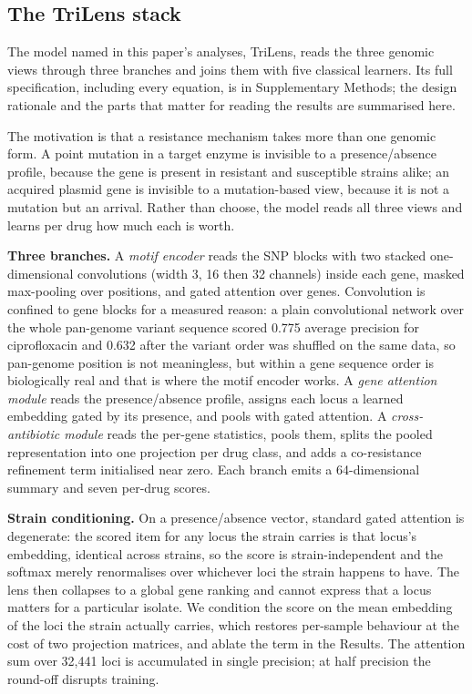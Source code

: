 \subsection*{The TriLens stack}
The model named in this paper's analyses, TriLens, reads the three genomic views through three
branches and joins them with five classical learners. Its full specification, including every
equation, is in Supplementary Methods; the design rationale and the parts that matter for reading
the results are summarised here.

The motivation is that a resistance mechanism takes more than one genomic form. A point mutation in
a target enzyme is invisible to a presence/absence profile, because the gene is present in
resistant and susceptible strains alike; an acquired plasmid gene is invisible to a mutation-based
view, because it is not a mutation but an arrival. Rather than choose, the model reads all three
views and learns per drug how much each is worth.

\textbf{Three branches.} A \emph{motif encoder} reads the SNP blocks with two stacked
one-dimensional convolutions (width 3, 16 then 32 channels) inside each gene, masked max-pooling
over positions, and gated attention \cite{ilse2018attention} over genes. Convolution is confined to
gene blocks for a measured reason: a plain convolutional network over the whole pan-genome variant
sequence scored 0.775 average precision for ciprofloxacin and 0.632 after the variant order was
shuffled on the same data, so pan-genome position is not meaningless, but within a gene sequence
order is biologically real and that is where the motif encoder works. A \emph{gene attention
module} reads the presence/absence profile, assigns each locus a learned embedding gated by its
presence, and pools with gated attention. A \emph{cross-antibiotic module} reads the per-gene
statistics, pools them, splits the pooled representation into one projection per drug class, and
adds a co-resistance refinement term initialised near zero. Each branch emits a 64-dimensional
summary and seven per-drug scores.

\textbf{Strain conditioning.} On a presence/absence vector, standard gated attention is degenerate:
the scored item for any locus the strain carries is that locus's embedding, identical across
strains, so the score is strain-independent and the softmax merely renormalises over whichever loci
the strain happens to have. The lens then collapses to a global gene ranking and cannot express
that a locus matters for a particular isolate. We condition the score on the mean embedding of the
loci the strain actually carries, which restores per-sample behaviour at the cost of two projection
matrices, and ablate the term in the Results. The attention sum over 32,441 loci is accumulated in
single precision; at half precision the round-off disrupts training.

